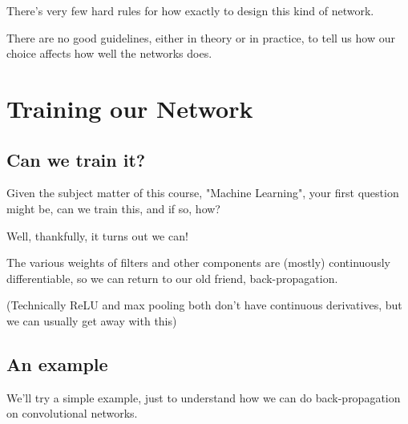         There's very few hard rules for how exactly to design this kind of network.
        
        There are no good guidelines, either in theory or in practice, to tell us how our choice affects how well the networks does.

\section{Training our Network}

    \subsection{Can we train it?}
    
        Given the subject matter of this course, "Machine Learning", your first question might be, can we train this, and if so, how?
        
        Well, thankfully, it turns out we can!
        
        The various weights of filters and other components are (mostly) continuously differentiable, so we can return to our old friend, back-propagation.
        
        (Technically ReLU and max pooling both don't have continuous derivatives, but we can usually get away with this)
        
    \subsection{An example}
    
        We'll try a simple example, just to understand how we can do back-propagation on convolutional networks.
        
